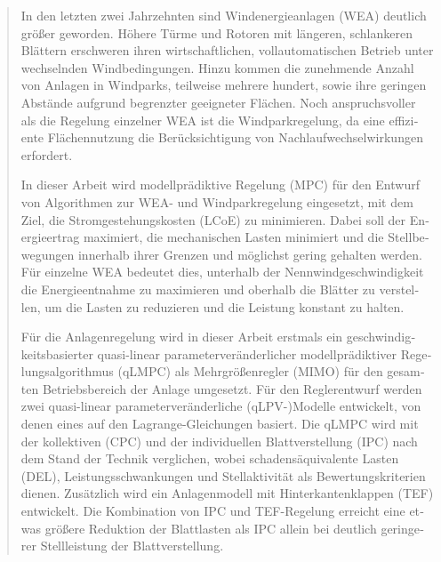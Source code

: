 \documentclass[12pt,a4paper,twoside]{report}
\begin{document}
\begin{otherlanguage}{ngerman}
{\renewcommand{\abstractname}{Kurzfassung}
    \begin{abstract}
In den letzten zwei Jahrzehnten sind Windenergieanlagen (WEA) deutlich größer geworden. Höhere Türme und Rotoren mit längeren, schlankeren Blättern erschweren ihren wirtschaftlichen, vollautomatischen Betrieb unter wechselnden Windbedingungen. Hinzu kommen die zunehmende Anzahl von Anlagen in Windparks, teilweise mehrere hundert, sowie ihre geringen Abstände aufgrund begrenzter geeigneter Flächen. Noch anspruchsvoller als die Regelung einzelner WEA ist die Windparkregelung, da eine effiziente Flächennutzung die Berücksichtigung von Nachlaufwechselwirkungen erfordert.

In dieser Arbeit wird modellprädiktive Regelung (MPC) für den Entwurf von Algorithmen zur WEA- und Windparkregelung eingesetzt, mit dem Ziel, die Stromgestehungskosten (LCoE) zu minimieren. Dabei soll der Energieertrag maximiert, die mechanischen Lasten minimiert und die Stellbewegungen innerhalb ihrer Grenzen und möglichst gering gehalten werden. Für einzelne WEA bedeutet dies, unterhalb der Nennwindgeschwindigkeit die Energieentnahme zu maximieren und oberhalb die Blätter zu verstellen, um die Lasten zu reduzieren und die Leistung konstant zu halten.

Für die Anlagenregelung wird in dieser Arbeit erstmals ein geschwindigkeitsbasierter quasi-linear parameterveränderlicher modellprädiktiver Regelungsalgorithmus (qLMPC) als Mehrgrößenregler (MIMO) für den gesamten Betriebsbereich der Anlage umgesetzt. Für den Reglerentwurf werden zwei quasi-linear parameterveränderliche (qLPV-)Modelle entwickelt, von denen eines auf den Lagrange-Gleichungen basiert. Die qLMPC wird mit der kollektiven (CPC) und der individuellen Blattverstellung (IPC) nach dem Stand der Technik verglichen, wobei schadensäquivalente Lasten (DEL), Leistungsschwankungen und Stellaktivität als Bewertungskriterien dienen. Zusätzlich wird ein Anlagenmodell mit Hinterkantenklappen (TEF) entwickelt. Die Kombination von IPC und TEF-Regelung erreicht eine etwas größere Reduktion der Blattlasten als IPC allein bei deutlich geringerer Stellleistung der Blattverstellung.


\end{abstract}}
\end{otherlanguage}
\end{document}
